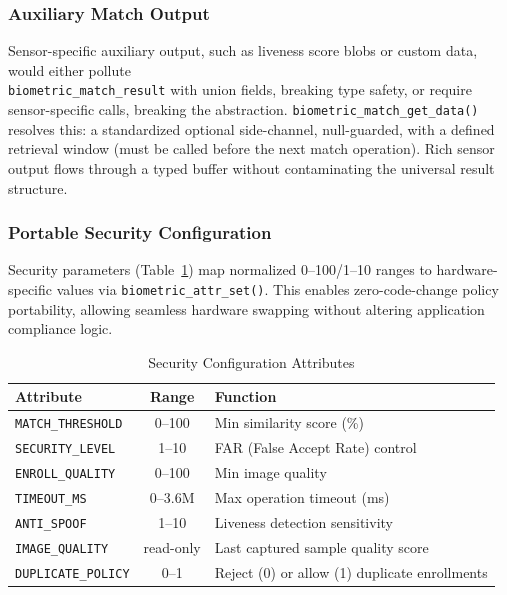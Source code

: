 \subsubsection{Auxiliary Match Output}
Sensor-specific auxiliary output, such as liveness score blobs or custom data, would either pollute \\ \texttt{biometric\_match\_result} with union fields, breaking type safety, or require sensor-specific calls, breaking the abstraction. \texttt{biometric\_match\_get\_data()} resolves this: a standardized optional side-channel, null-guarded, with a defined retrieval window (must be called before the next match operation). Rich sensor output flows through a typed buffer without contaminating the universal result structure.

\subsubsection{Portable Security Configuration}
Security parameters (Table~\ref{tab:attributes}) map normalized 0--100/1--10 ranges to hardware-specific values via \texttt{biometric\_attr\_set()}. This enables zero-code-change policy portability, allowing seamless hardware swapping without altering application compliance logic.

\begin{table}
\caption{Security Configuration Attributes}
\label{tab:attributes}
\centering
\renewcommand{\arraystretch}{1.4}
\setlength{\tabcolsep}{4pt}
\begin{tabularx}{\columnwidth}{|l|c|X|}
\hline
\textbf{Attribute} & \textbf{Range} & \textbf{Function} \\
\hline
\texttt{MATCH\_THRESHOLD} & 0--100 & Min similarity score (\%) \\
\hline
\texttt{SECURITY\_LEVEL} & 1--10 & FAR (False Accept Rate) control \\
\hline
\texttt{ENROLL\_QUALITY} & 0--100 & Min image quality \\
\hline
\texttt{TIMEOUT\_MS} & 0--3.6M & Max operation timeout (ms) \\
\hline
\texttt{ANTI\_SPOOF} & 1--10 & Liveness detection sensitivity \\
\hline
\texttt{IMAGE\_QUALITY} & read-only & Last captured sample quality score \\
\hline
\texttt{DUPLICATE\_POLICY} & 0--1 & Reject (0) or allow (1) duplicate enrollments \\
\hline
\end{tabularx}
\end{table}

